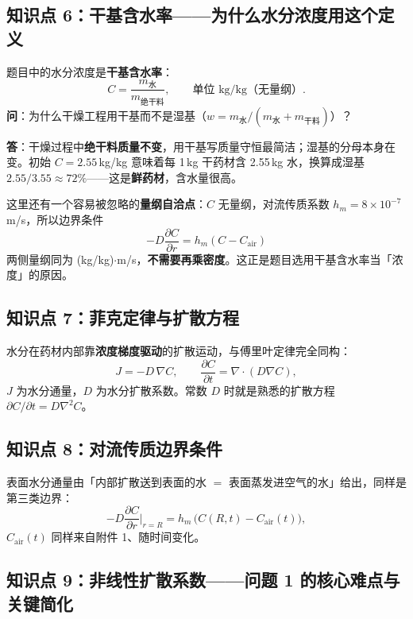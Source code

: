 \documentclass[12pt,a4paper]{ctexart}
\begin{document}
\subsection{知识点 6：干基含水率——为什么水分浓度用这个定义}

题目中的水分浓度是\textbf{干基含水率}：
\begin{equation}
C=\frac{m_{\text{水}}}{m_{\text{绝干料}}},\qquad \text{单位 kg/kg（无量纲）}.
\end{equation}
\textbf{问}：为什么干燥工程用干基而不是湿基（$w=m_{\text{水}}/(m_{\text{水}}+m_{\text{干料}})$）？

\textbf{答}：干燥过程中\textbf{绝干料质量不变}，用干基写质量守恒最简洁；湿基的分母本身在变。初始 $C=2.55$\,kg/kg 意味着每 1\,kg 干药材含 2.55\,kg 水，换算成湿基 $2.55/3.55\approx72\%$——这是\textbf{鲜药材}，含水量很高。

这里还有一个容易被忽略的\textbf{量纲自洽点}：$C$ 无量纲，对流传质系数 $h_m=8\times10^{-7}$\,m/s，所以边界条件
\[
-D\frac{\partial C}{\partial r}=h_m(C-C_{\mathrm{air}})
\]
两侧量纲同为 (kg/kg)$\cdot$m/s，\textbf{不需要再乘密度}。这正是题目选用干基含水率当「浓度」的原因。

\subsection{知识点 7：菲克定律与扩散方程}

水分在药材内部靠\textbf{浓度梯度驱动}的扩散运动，与傅里叶定律完全同构：
\begin{equation}
J=-D\,\nabla C,\qquad \frac{\partial C}{\partial t}=\nabla\cdot(D\nabla C),
\end{equation}
$J$ 为水分通量，$D$ 为水分扩散系数。常数 $D$ 时就是熟悉的扩散方程 $\partial C/\partial t=D\nabla^2 C$。

\subsection{知识点 8：对流传质边界条件}

表面水分通量由「内部扩散送到表面的水 $=$ 表面蒸发进空气的水」给出，同样是第三类边界：
\begin{equation}
-D\frac{\partial C}{\partial r}\bigg|_{r=R}=h_m\,\big(C(R,t)-C_{\mathrm{air}}(t)\big),
\label{eq:bcC}
\end{equation}
$C_{\mathrm{air}}(t)$ 同样来自附件 1、随时间变化。

\subsection{知识点 9：非线性扩散系数——问题 1 的核心难点与关键简化}
\end{document}
